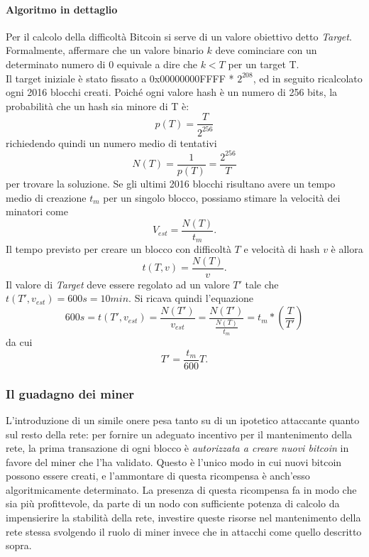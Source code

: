 			\paragraph{Algoritmo in dettaglio}
				Per il calcolo della difficoltà Bitcoin si serve di un valore obiettivo detto \emph{Target}. Formalmente, affermare che un valore binario $k$ deve cominciare con un determinato numero di 0 equivale a dire che $k < T$ per un target T. \\
				Il target iniziale è stato fissato a 0x00000000FFFF * $2^{208}$, ed in seguito ricalcolato ogni 2016 blocchi creati. Poiché ogni valore hash è un numero di 256 bits, la probabilità che un hash sia minore di T è: 
				$$p(T) = \frac{T}{2^{256}}$$
				richiedendo quindi un numero medio di tentativi 
				$$N(T) = \frac{1}{p(T)} = \frac{2^{256}}{T}$$
				per trovare la soluzione.
				Se gli ultimi 2016 blocchi risultano avere un tempo medio di creazione $t_m$ per un singolo blocco, possiamo stimare la velocità dei minatori come 
				$$V_{est} = \frac{N(T)}{t_m}.$$
				Il tempo previsto per creare un blocco con difficoltà $T$ e velocità di hash $v$ è allora
				$$t(T,v) = \frac{N(T)}{v}.$$
				Il valore di \emph{Target} deve essere regolato ad un valore $T'$ tale che $t(T', v_{est}) = 600s = 10min.$
				Si ricava quindi l'equazione
				$$600s = t(T', v_{est}) = \frac{N(T')}{v_{est}} = \frac{N(T')}{\frac{N(T)}{t_m}} = t_m * (\frac{T}{T'})$$
				da cui
				$$T' = \frac{t_m}{600}T.$$
		
		\subsubsection{Il guadagno dei miner}
			L'introduzione di un simile onere pesa tanto su di un ipotetico attaccante quanto sul resto della rete: per fornire un adeguato incentivo per il mantenimento della rete, la prima transazione di ogni blocco è \emph{autorizzata a creare nuovi bitcoin} in favore del miner che l'ha validato. Questo è l'unico modo in cui nuovi bitcoin possono essere creati, e l'ammontare di questa ricompensa è anch'esso algoritmicamente determinato. La presenza di questa ricompensa fa in modo che sia più profittevole, da parte di un nodo con sufficiente potenza di calcolo da impensierire la stabilità della rete, investire queste risorse nel mantenimento della rete stessa svolgendo il ruolo di miner invece che in attacchi come quello descritto sopra.
